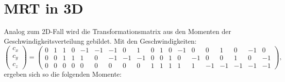 \section{MRT in 3D}
Analog zum 2D-Fall wird die Transformationsmatrix aus den Momenten der Geschwindigkeitsverteilung gebildet.
Mit den Geschwindigkeiten:
\begin{equation}
\left(\begin{smallmatrix} 
c_x \\
c_y \\
c_z
\end{smallmatrix} \right) = 
\left(\begin{smallmatrix} 
0 & 1 & 1 & 0 & -1 & -1 & -1 &  0 &  1 & 0 & 1 & 0 & -1 &  0 & 0  &  1 &  0 & -1 & 0 \\
0 & 0 & 1 & 1 &  1 &  0 & -1 & -1 & -1 & 0 & 0 & 1 &  0 & -1 & 0  &  0 &  1 &  0 & -1 \\
0 & 0 & 0 & 0 &  0 &  0 &  0 &  0 &  0 & 1 & 1 & 1 &  1 &  1 & -1 & -1 & -1 & -1 & -1
\end{smallmatrix} \right) ,
\end{equation}
ergeben sich so die folgenden Momente:
